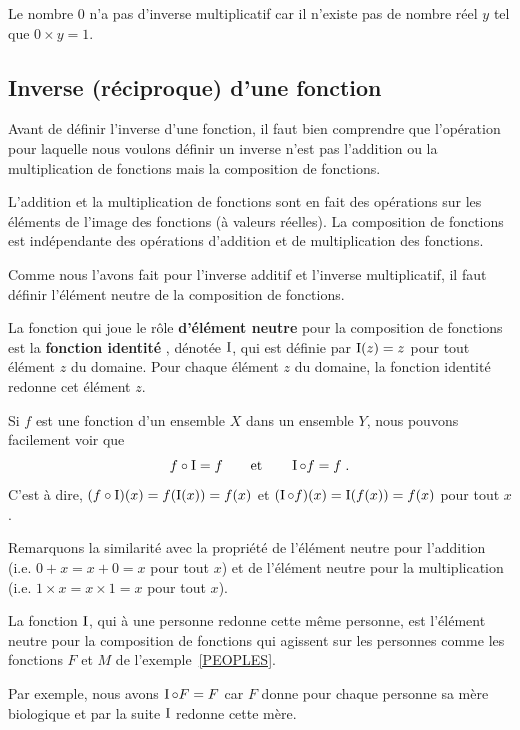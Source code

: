 {\begin{rmk}
Le nombre $0$ n'a pas d'inverse multiplicatif car il n'existe pas de
nombre réel $y$ tel que $0 \times y = 1$.
\end{rmk}

\subsection{Inverse (réciproque) d'une fonction}

Avant de définir l'inverse d'une fonction, il faut bien comprendre que
l'opération pour laquelle nous voulons définir un inverse n'est pas
l'addition ou la multiplication de fonctions mais la composition de
fonctions.

L'addition et la multiplication de fonctions sont en fait des
opérations sur les éléments de l'image des fonctions (à valeurs
réelles).  La composition de fonctions est indépendante des opérations
d'addition et de multiplication des fonctions.

Comme nous l'avons fait pour l'inverse additif et l'inverse multiplicatif,
il faut définir l'élément neutre de la composition de fonctions.

\begin{defn}
La fonction qui joue le rôle {\bfseries d'élément neutre}
 pour la composition de fonctions est la
{\bfseries fonction identité} , dénotée
$\operatorname{I}$, qui est définie par $\operatorname{I}(z) = z$ pour tout élément $z$ du
domaine.  Pour chaque élément $z$ du domaine, la fonction identité
redonne cet élément $z$.
\end{defn}

Si $f$ est une fonction d'un ensemble $X$ dans un ensemble $Y$, nous
pouvons facilement voir que
\[
f \circ \operatorname{I} = f \qquad \text{et} \qquad \operatorname{I} \circ f = f \; .
\]
C'est à dire, $(f\circ \operatorname{I})(x) = f(\operatorname{I}(x)) = f(x)$ et
$(\operatorname{I}\circ f)(x) = \operatorname{I}(f(x))= f(x)$ pour tout $x$.

Remarquons la similarité avec la propriété de l'élément neutre pour
l'addition (i.e. $0 + x = x + 0 = x$ pour tout $x$) et de l'élément
neutre pour la multiplication (i.e. $1 \times x = x \times 1 = x$ pour
tout $x$).

\begin{egg}
La fonction $\operatorname{I}$, qui à une personne redonne cette même personne, est
l'élément neutre pour la composition de fonctions qui agissent sur les
personnes comme les fonctions $F$ et $M$ de l'exemple~\ref{PEOPLES}.

Par exemple, nous avons $\operatorname{I} \circ F = F$ car $F$ donne pour chaque
personne sa mère biologique et par la suite $\operatorname{I}$ redonne cette mère.
\end{egg}

}
